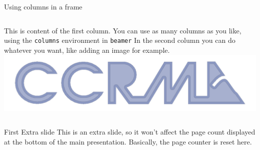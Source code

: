 \documentclass{beamer}
\begin{document}
\begin{frame}{Using columns in a frame}
    \begin{columns}[t]
            This is content of the first column. You can use as many columns as you like, using the \texttt{columns} environment in \texttt{beamer}
            In the second column you can do whatever you want, like adding an image for example.
            \includegraphics[width=\textwidth]{ccrma-logo.pdf}
    \end{columns}
\end{frame}



\appendix  %

\begin{frame}{First Extra slide}
This is an extra slide, so it won't affect the page count displayed at the bottom of the main presentation. Basically, the page counter is reset here.
\end{frame}
\end{document}
